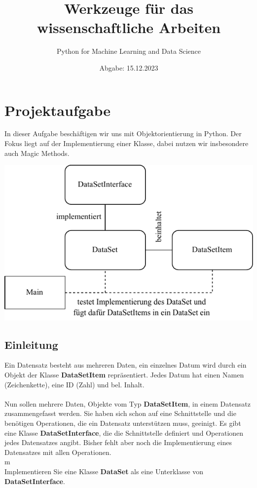\documentclass{scrartcl}
\title{\textbf{\LARGE Werkzeuge für das wissenschaftliche Arbeiten}}
\subtitle{\small Python for Machine Learning and Data Science}
\author{Abgabe: 15.12.2023}
\date{}
\begin{document}
\maketitle
\tableofcontents
\section[Projektaufgabe]{Projektaufgabe}
In dieser Aufgabe beschäftigen wir uns mit Objektorientierung in Python.
Der Fokus liegt auf der Implementierung einer Klasse, dabei nutzen wir insbesondere auch Magic Methods.\\
\begin{center}
\includegraphics{../diagram/classes_files.pdf}
\end{center}
\subsection[Einleitung]{Einleitung}
Ein Datensatz besteht aus mehreren Daten, ein einzelnes Datum wird durch ein Objekt der Klasse \textbf{DataSetItem} repräsentiert.
Jedes Datum hat einen Namen (Zeichenkette), eine ID (Zahl) und bel. Inhalt.
\\
\\
Nun sollen mehrere Daten, Objekte vom Typ \textbf{DataSetItem}, in einem Datensatz zusammengefasst werden.
Sie haben sich schon auf eine Schnittstelle und die benötigen Operationen, die ein Datensatz unterstützen muss, geeinigt.
Es gibt eine Klasse \textbf{DataSetInterface}, die die Schnittstelle definiert und Operationen jedes Datensatzes angibt.
Bisher fehlt aber noch die Implementierung eines Datensatzes mit allen Operationen.
\\m
\\
Implementieren Sie eine Klasse \textbf{DataSet} als eine Unterklasse von \textbf{DataSetInterface}.
\end{document}
